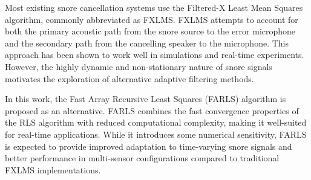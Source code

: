 Most existing snore cancellation systems use the Filtered-X Least Mean Squares algorithm, commonly abbreviated as FXLMS. FXLMS attempts to account for both the primary acoustic path from the snore source to the error microphone and the secondary path from the cancelling speaker to the microphone. This approach has been shown to work well in simulations and real-time experiments. However, the highly dynamic and non-stationary nature of snore signals motivates the exploration of alternative adaptive filtering methods.

In this work, the Fast Array Recursive Least Squares (FARLS) algorithm is proposed as an alternative. FARLS combines the fast convergence properties of the RLS algorithm with reduced computational complexity, making it well-suited for real-time applications\cite{FARLS_EQ}. While it introduces some numerical sensitivity, FARLS is expected to provide improved adaptation to time-varying snore signals and better performance in multi-sensor configurations compared to traditional FXLMS implementations.





